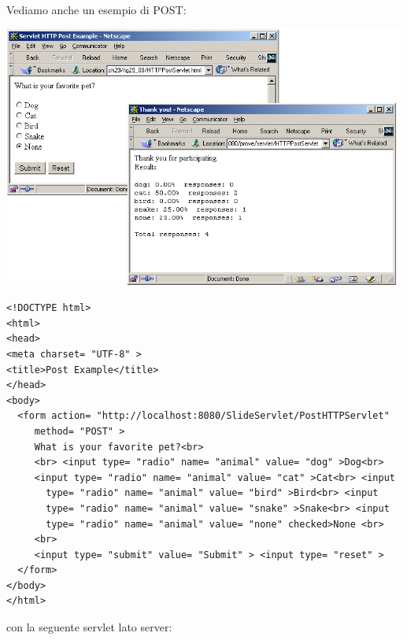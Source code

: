 \message{ !name(sd.tex)}\documentclass[a4paper,12pt, oneside]{book}
\begin{document}
\newpage
Vediamo anche un esempio di POST:
\begin{center}
	\includegraphics[scale=0.7]{img/post.png}
\end{center}
\begin{verbatim}
<!DOCTYPE html>
<html>
<head>
<meta charset= "UTF-8" >
<title>Post Example</title>
</head>
<body>
  <form action= "http://localhost:8080/SlideServlet/PostHTTPServlet"
     method= "POST" >
     What is your favorite pet?<br>
     <br> <input type= "radio" name= "animal" value= "dog" >Dog<br>
     <input type= "radio" name= "animal" value= "cat" >Cat<br> <input
       type= "radio" name= "animal" value= "bird" >Bird<br> <input
       type= "radio" name= "animal" value= "snake" >Snake<br> <input
       type= "radio" name= "animal" value= "none" checked>None <br>
     <br>
     <input type= "submit" value= "Submit" > <input type= "reset" >
  </form>
</body>
</html> 
\end{verbatim}
con la seguente servlet lato server:
\end{document}
